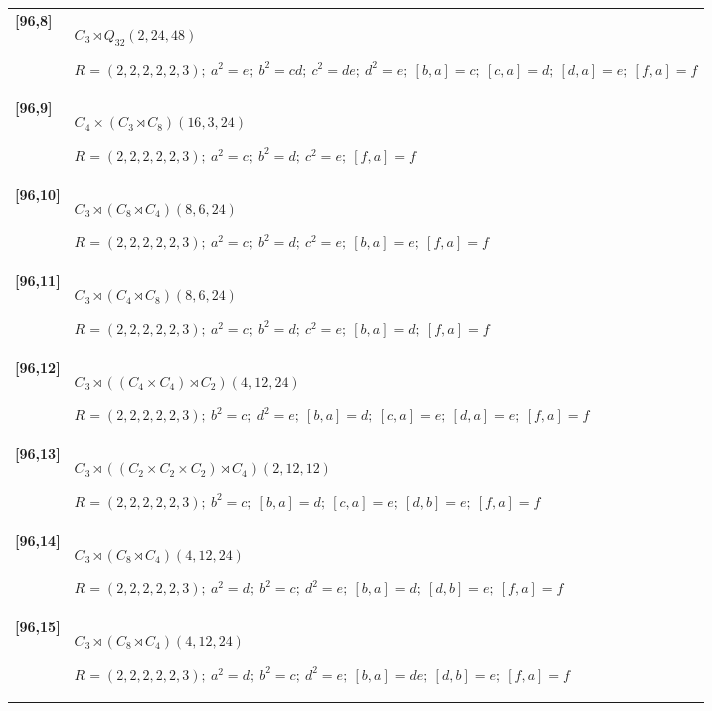 \documentclass[UTF8,fontset=fandol,11pt,a4paper]{ctexart}
\begin{document}
\begin{longtable}{@{}p{17mm}>{\raggedright\arraybackslash}p{141mm}@{}}
\textbf{[96,8]} & $C_{3}\rtimes Q_{32}$\quad $(2,24,48)$\par\(R=(2,2,2,2,2,3);\allowbreak\ a^{2}=e;\allowbreak\ b^{2}=cd;\allowbreak\ c^{2}=de;\allowbreak\ d^{2}=e;\allowbreak\ [b,a]=c;\allowbreak\ [c,a]=d;\allowbreak\ [d,a]=e;\allowbreak\ [f,a]=f\)\\[3pt]

\textbf{[96,9]} & $C_{4}\times (C_{3}\rtimes C_{8})$\quad $(16,3,24)$\par\(R=(2,2,2,2,2,3);\allowbreak\ a^{2}=c;\allowbreak\ b^{2}=d;\allowbreak\ c^{2}=e;\allowbreak\ [f,a]=f\)\\[3pt]

\textbf{[96,10]} & $C_{3}\rtimes (C_{8}\rtimes C_{4})$\quad $(8,6,24)$\par\(R=(2,2,2,2,2,3);\allowbreak\ a^{2}=c;\allowbreak\ b^{2}=d;\allowbreak\ c^{2}=e;\allowbreak\ [b,a]=e;\allowbreak\ [f,a]=f\)\\[3pt]

\textbf{[96,11]} & $C_{3}\rtimes (C_{4}\rtimes C_{8})$\quad $(8,6,24)$\par\(R=(2,2,2,2,2,3);\allowbreak\ a^{2}=c;\allowbreak\ b^{2}=d;\allowbreak\ c^{2}=e;\allowbreak\ [b,a]=d;\allowbreak\ [f,a]=f\)\\[3pt]

\textbf{[96,12]} & $C_{3}\rtimes ((C_{4}\times C_{4})\rtimes C_{2})$\quad $(4,12,24)$\par\(R=(2,2,2,2,2,3);\allowbreak\ b^{2}=c;\allowbreak\ d^{2}=e;\allowbreak\ [b,a]=d;\allowbreak\ [c,a]=e;\allowbreak\ [d,a]=e;\allowbreak\ [f,a]=f\)\\[3pt]

\textbf{[96,13]} & $C_{3}\rtimes ((C_{2}\times C_{2}\times C_{2})\rtimes C_{4})$\quad $(2,12,12)$\par\(R=(2,2,2,2,2,3);\allowbreak\ b^{2}=c;\allowbreak\ [b,a]=d;\allowbreak\ [c,a]=e;\allowbreak\ [d,b]=e;\allowbreak\ [f,a]=f\)\\[3pt]

\textbf{[96,14]} & $C_{3}\rtimes (C_{8}\rtimes C_{4})$\quad $(4,12,24)$\par\(R=(2,2,2,2,2,3);\allowbreak\ a^{2}=d;\allowbreak\ b^{2}=c;\allowbreak\ d^{2}=e;\allowbreak\ [b,a]=d;\allowbreak\ [d,b]=e;\allowbreak\ [f,a]=f\)\\[3pt]

\textbf{[96,15]} & $C_{3}\rtimes (C_{8}\rtimes C_{4})$\quad $(4,12,24)$\par\(R=(2,2,2,2,2,3);\allowbreak\ a^{2}=d;\allowbreak\ b^{2}=c;\allowbreak\ d^{2}=e;\allowbreak\ [b,a]=de;\allowbreak\ [d,b]=e;\allowbreak\ [f,a]=f\)\\[3pt]


\end{longtable}
\end{document}
